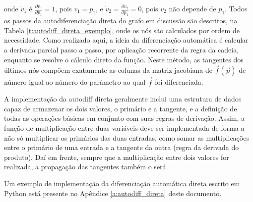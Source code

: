       \noindent onde $\dot{v}_1$ é $\frac{\partial v_1}{\partial p_1} = 1$, pois $v_1 = p_1$, e $\dot{v}_2 = \frac{\partial v_2}{\partial p_1} = 0$, pois $v_2$ não depende de $p_1$. Todos os passos da autodiferenciação direta do grafo em discussão são descritos, na Tabela \ref{t:autodiff_direta_exemplo}, onde os nós são calculados por ordem de necessidade. Como realizado aqui, a ideia da diferenciação automática é calcular a derivada parcial passo a passo, por aplicação recorrente da regra da cadeia, enquanto se resolve o cálculo direto da função. Neste método, as tangentes dos últimos nós compõem exatamente as colunas da matriz jacobiana de $\vec{f}(\vec{p})$ de número igual ao número do parâmetro ao qual $\vec{f}$ foi diferenciada.

      A implementação da autodiff direta geralmente inclui uma estrutura de dados capaz de armazenar os dois valores, o primário e a tangente, e a definição de todas as operações básicas em conjunto com suas regras de derivação. Assim, a função de multiplicação entre duas variáveis deve ser implementada de forma a não só multiplicar os primários das duas entradas, como somar as multiplicações entre o primário de uma entrada e a tangente da outra (regra da derivada do produto). Daí em frente, sempre que a multiplicação entre dois valores for realizada, a propagação das tangentes também o será.

      Um exemplo de implementação da diferenciação automática direta escrito em Python está presente no Apêndice \ref{a:autodiff_direta} deste documento.


